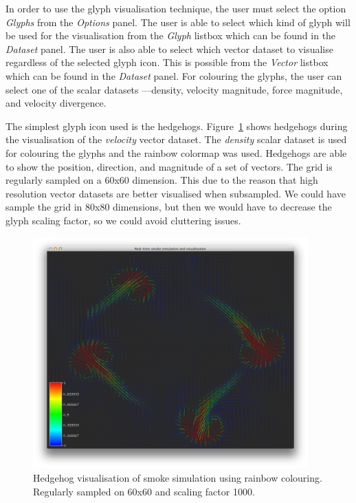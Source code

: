 In order to use the glyph visualisation technique, the user must select the option \emph{Glyphs} from the \emph{Options} panel. The user is able to select which kind of glyph will be used for the visualisation from the \emph{Glyph} listbox which can be found in the \emph{Dataset} panel. The user is also able to select which vector dataset to visualise regardless of the selected glyph icon. This is possible from the \emph{Vector} listbox which can be found in the \emph{Dataset} panel. For colouring the glyphs, the user can select one of the scalar datasets ---density, velocity magnitude, force magnitude, and velocity divergence.

The simplest glyph icon used is the hedgehogs. Figure~\ref{fig:hedgehogs} shows hedgehogs during the visualisation of the \emph{velocity} vector dataset. The \emph{density} scalar dataset is used for colouring the glyphs and the rainbow colormap was used. Hedgehogs are able to show the position, direction, and magnitude of a set of vectors. The grid is regularly sampled on a 60x60 dimension. This due to the reason that high resolution vector datasets are better visualised when subsampled. We could have sample the grid in 80x80 dimensions, but then we would have to decrease the glyph scaling factor, so we could avoid cluttering issues.

\begin{figure}[htbp]
\begin{center}
 \includegraphics[height=3.5in]{figures/glyph/hedgehogsRainbow.png}
\caption{Hedgehog visualisation of smoke simulation using rainbow colouring. Regularly sampled on 60x60 and scaling factor 1000.}
\label{fig:hedgehogs}
\end{center}
\end{figure}

